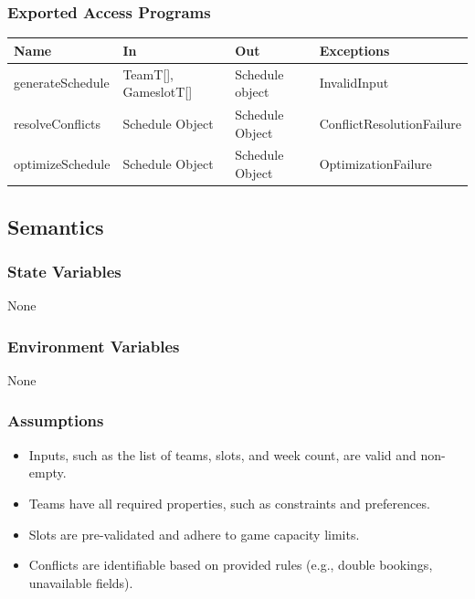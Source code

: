 \documentclass[12pt, titlepage]{article}
\begin{document}
\subsubsection{Exported Access Programs}

\begin{center}
  \begin{tabular}{|p{3cm}|p{3.5cm}|p{3.5cm}|p{5cm}|}
    \hline
    Name             & In                   & Out             & Exceptions                \\
    \hline
    generateSchedule & TeamT[], GameslotT[] & Schedule object & InvalidInput              \\
    resolveConflicts & Schedule Object      & Schedule Object & ConflictResolutionFailure \\
    optimizeSchedule & Schedule Object      & Schedule Object & OptimizationFailure       \\
    \hline
  \end{tabular}
\end{center}

\subsection{Semantics}

\subsubsection{State Variables}
None

\subsubsection{Environment Variables}
None

\subsubsection{Assumptions}
\begin{itemize}
  \item Inputs, such as the list of teams, slots, and week count, are valid and non-empty.
  \item Teams have all required properties, such as constraints and preferences.
  \item Slots are pre-validated and adhere to game capacity limits.
  \item Conflicts are identifiable based on provided rules (e.g., double bookings, unavailable fields).
\end{itemize}
\end{document}
